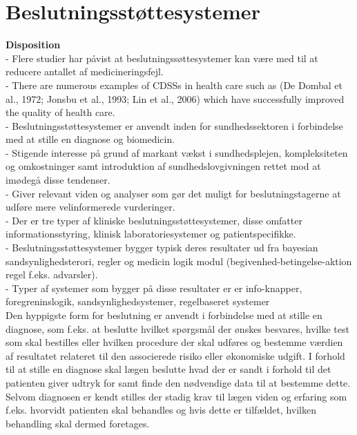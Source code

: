 \chapter{Beslutningsstøttesystemer}

\textbf{Disposition} \\
- Flere studier har påvist at beslutningssøttesystemer kan være med til at reducere antallet af medicineringsfejl. \\
- There are numerous examples of CDSSs
in health care such as (De Dombal et al., 1972; Jonsbu et al., 1993; Lin et al., 2006) which have successfully improved the quality
of health care. \citep{Kong2012} \\
- Beslutningsstøttesystemer er anvendt inden for sundhedssektoren i forbindelse med at stille en diagnose og biomedicin.  \\ 
- Stigende interesse på grund af markant vækst i sundhedsplejen, kompleksiteten og omkostninger samt introduktion af sundhedslovgivningen rettet mod at imødegå disse tendenser. \\
- Giver relevant viden og analyser som gør det muligt for beslutningstagerne at udføre mere velinformerede vurderinger. \\
- Der er tre typer af kliniske beslutningsstøttesystemer, disse omfatter informationsstyring, klinisk laboratoriesystemer og patientspecifikke. \\
- Beslutningsstøttesystemer bygger typisk deres resultater ud fra bayesian sandsynlighedsterori, regler og medicin logik modul (begivenhed-betingelse-aktion regel f.eks. advarsler). \\
- Typer af systemer som bygger på disse resultater er er info-knapper, foregreninslogik, sandsynlighedsystemer, regelbaseret systemer  \\







Den hyppigste form for beslutning er anvendt i forbindelse med at stille en diagnose, som f.eks. at beslutte hvilket spørgsmål der ønskes besvares, hvilke test som skal bestilles eller hvilken procedure der skal udføres og bestemme værdien af resultatet relateret til den associerede risiko eller økonomiske udgift. I forhold til at stille en diagnose skal lægen beslutte hvad der er sandt i forhold til det patienten giver udtryk for samt finde den nødvendige data til at bestemme dette. Selvom diagnosen er kendt stilles der stadig krav til lægen viden og erfaring som f.eks. hvorvidt patienten skal behandles og hvis dette er tilfældet, hvilken behandling skal dermed foretages.\citep{Masys2006}

